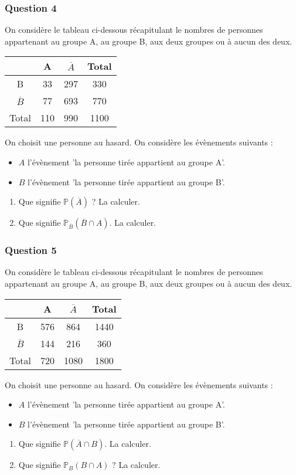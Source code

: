 \documentclass[15pt, mathserif]{beamer}
\begin{document}
\begin{frame} 
	\frametitle{Question 4}
On considère le tableau ci-dessous récapitulant le nombres de personnes appartenant au groupe A, au groupe B, aux deux groupes ou à aucun des deux.\begin{center} 
 \begin{tabular}{|c|c|c|c|} 
 \cline{2-4} 
 \multicolumn{1}{c|}{} & A & $\overline{A}$ & Total \\\hline 
 B   &33  &297& 330 \\\hline 
 $\overline{B}$   &77 & 693 & 770 \\\hline 
 Total   &110&990 &1100 \\\hline  
 \end{tabular} 
 \end{center} On choisit une personne au hasard. On considère les évènements suivants : 
 \begin{itemize} 
 \item $A$ l'évènement 'la personne tirée appartient au groupe A'. 
 \item $B$ l'évènement 'la personne tirée appartient au groupe B'. 
 \end{itemize} 
 \begin{enumerate} 
 \item Que signifie $\mathbb{P}(\overline{A})$ ? La calculer. 
 \item Que signifie $\mathbb{P}_{\overline{B}} (\overline{B} \cap A)$. La calculer. 
  \end{enumerate} 
 \end{frame}


\begin{frame} 
	\frametitle{Question 5}
On considère le tableau ci-dessous récapitulant le nombres de personnes appartenant au groupe A, au groupe B, aux deux groupes ou à aucun des deux.\begin{center} 
 \begin{tabular}{|c|c|c|c|} 
 \cline{2-4} 
 \multicolumn{1}{c|}{} & A & $\overline{A}$ & Total \\\hline 
 B   &576  &864& 1440 \\\hline 
 $\overline{B}$   &144 & 216 & 360 \\\hline 
 Total   &720&1080 &1800 \\\hline  
 \end{tabular} 
 \end{center} On choisit une personne au hasard. On considère les évènements suivants : 
 \begin{itemize} 
 \item $A$ l'évènement 'la personne tirée appartient au groupe A'. 
 \item $B$ l'évènement 'la personne tirée appartient au groupe B'. 
 \end{itemize} 
 \begin{enumerate} 
 \item Que signifie $\mathbb{P}(\overline{A} \cap B)$. La calculer. 
 \item Que signifie $\mathbb{P}_{B} (B \cap A)$ ? La calculer. 
  \end{enumerate} 
 \end{frame}
\end{document}
